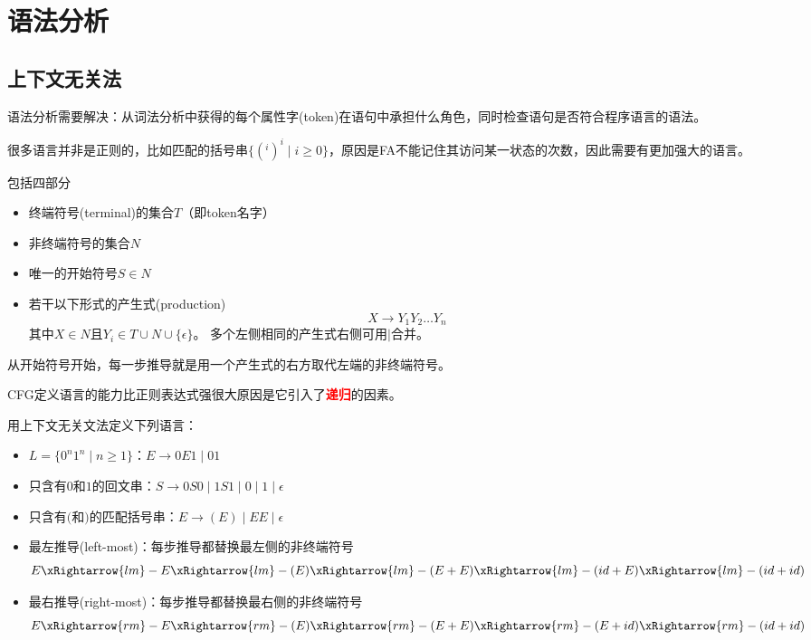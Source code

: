 
\section{语法分析}
\subsection{上下文无关法}
语法分析需要解决：从词法分析中获得的每个属性字(token)在语句中承担什么角色，同时检查语句是否符合程序语言的语法。

很多语言并非是正则的，比如匹配的括号串$\{(^i)^i\mid i\geq 0\}$，原因是FA不能记住其访问某一状态的次数，因此需要有更加强大的语言。

\begin{definition}
包括四部分
\begin{itemize}
	\item 终端符号(terminal)的集合$T$（即token名字）
	\item 非终端符号的集合$N$
	\item 唯一的开始符号$S\in N$
	\item 若干以下形式的产生式(production)
	\[X\to Y_1Y_2\ldots Y_n\]
	其中$X\in N$且$Y_i\in T\cup N\cup\{\epsilon\}$。
	多个左侧相同的产生式右侧可用$\mid$合并。
\end{itemize}
\end{definition}
\begin{definition}[推导(derivation)]
从开始符号开始，每一步推导就是用一个产生式的右方取代左端的非终端符号。
\end{definition}

CFG定义语言的能力比正则表达式强很大原因是它引入了\textcolor{red}{\textbf{递归}}的因素。

\begin{example}
用上下文无关文法定义下列语言：
\begin{itemize}
	\item $L=\{0^n1^n\mid n\geq 1\}$：$E\to 0E1\mid 01$
	\item 只含有$0$和$1$的回文串：$S\to 0S0\mid 1S1\mid 0\mid 1\mid \epsilon$
	\item 只含有$($和$)$的匹配括号串：$E\to (E)\mid EE\mid \epsilon$
\end{itemize}
\end{example}

\begin{itemize}
	\item 最左推导(left-most)：每步推导都替换最左侧的非终端符号
	\[E\xRightarrow{lm}
	-E\xRightarrow{lm}
	-(E)\xRightarrow{lm}
	-(E+E)\xRightarrow{lm}
	-(id+E)\xRightarrow{lm}
	-(id+id)\]
	\item 最右推导(right-most)：每步推导都替换最右侧的非终端符号
	\[E\xRightarrow{rm}
	-E\xRightarrow{rm}
	-(E)\xRightarrow{rm}
	-(E+E)\xRightarrow{rm}
	-(E+id)\xRightarrow{rm}
	-(id+id)\]
\end{itemize}

